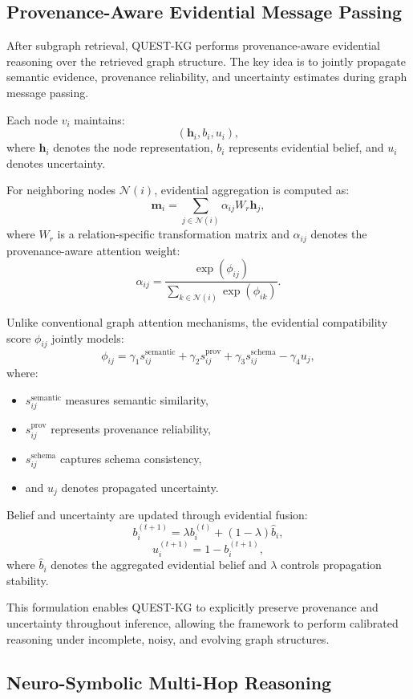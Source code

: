 \documentclass[sigconf,review,anonymous]{acmart}
\begin{document}
\subsection{Provenance-Aware Evidential Message Passing}

After subgraph retrieval, QUEST-KG performs provenance-aware evidential reasoning over the retrieved graph structure. The key idea is to jointly propagate semantic evidence, provenance reliability, and uncertainty estimates during graph message passing.

Each node $v_i$ maintains:
\[
(\mathbf{h}_i,b_i,u_i),
\]
where $\mathbf{h}_i$ denotes the node representation, $b_i$ represents evidential belief, and $u_i$ denotes uncertainty.

For neighboring nodes $\mathcal{N}(i)$, evidential aggregation is computed as:
\[
\mathbf{m}_i
=
\sum_{j\in\mathcal{N}(i)}
\alpha_{ij}W_r\mathbf{h}_j,
\]
where $W_r$ is a relation-specific transformation matrix and $\alpha_{ij}$ denotes the provenance-aware attention weight:
\[
\alpha_{ij}
=
\frac{
\exp(\phi_{ij})
}{
\sum_{k\in\mathcal{N}(i)}
\exp(\phi_{ik})
}.
\]

Unlike conventional graph attention mechanisms, the evidential compatibility score $\phi_{ij}$ jointly models:
\[
\phi_{ij}
=
\gamma_1 s_{ij}^{\text{semantic}}
+
\gamma_2 s_{ij}^{\text{prov}}
+
\gamma_3 s_{ij}^{\text{schema}}
-
\gamma_4 u_j,
\]
where:
\begin{itemize}
    \item $s_{ij}^{\text{semantic}}$ measures semantic similarity,
    \item $s_{ij}^{\text{prov}}$ represents provenance reliability,
    \item $s_{ij}^{\text{schema}}$ captures schema consistency,
    \item and $u_j$ denotes propagated uncertainty.
\end{itemize}

Belief and uncertainty are updated through evidential fusion:
\[
b_i^{(t+1)}
=
\lambda b_i^{(t)}
+
(1-\lambda)\hat{b}_i,
\]
\[
u_i^{(t+1)}
=
1-b_i^{(t+1)},
\]
where $\hat{b}_i$ denotes the aggregated evidential belief and $\lambda$ controls propagation stability.

This formulation enables QUEST-KG to explicitly preserve provenance and uncertainty throughout inference, allowing the framework to perform calibrated reasoning under incomplete, noisy, and evolving graph structures.

\subsection{Neuro-Symbolic Multi-Hop Reasoning}
\end{document}
